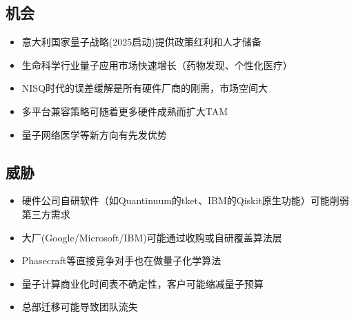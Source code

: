 \documentclass[11pt,a4paper]{ctexart}
\begin{document}
\subsection{机会}
\begin{itemize}[leftmargin=1.5em]
\item 意大利国家量子战略(2025启动)提供政策红利和人才储备
\item 生命科学行业量子应用市场快速增长（药物发现、个性化医疗）
\item NISQ时代的误差缓解是所有硬件厂商的刚需，市场空间大
\item 多平台兼容策略可随着更多硬件成熟而扩大TAM
\item 量子网络医学等新方向有先发优势
\end{itemize}
\subsection{威胁}
\begin{itemize}[leftmargin=1.5em]
\item 硬件公司自研软件（如Quantinuum的tket、IBM的Qiskit原生功能）可能削弱第三方需求
\item 大厂(Google/Microsoft/IBM)可能通过收购或自研覆盖算法层
\item Phasecraft等直接竞争对手也在做量子化学算法
\item 量子计算商业化时间表不确定性，客户可能缩减量子预算
\item 总部迁移可能导致团队流失
\end{itemize}

\end{document}
